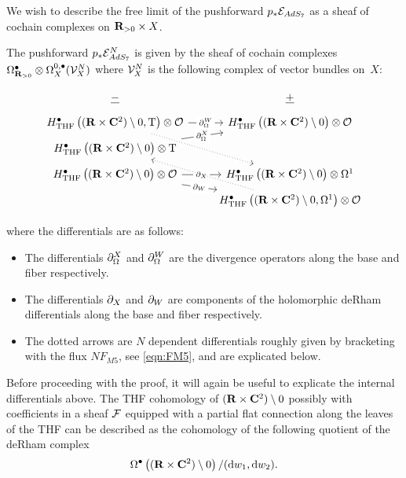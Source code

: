 \documentclass[../main.tex]{subfiles}
\begin{document}
We wish to describe the free limit of the pushforward $p_* \mathcal{E}_{AdS_7}$ as a sheaf of cochain complexes on $\mathbf{R}_{>0}\times X$. 

\begin{prop}\label{prop:ads7push}
The pushforward $p_* \mathcal{E}^N_{AdS_7}$ is given by the sheaf of cochain complexes $\Omega^\bullet_{\mathbf{R}_{>0}} \otimes \Omega^{0,\bullet}_{X} (\mathcal{V}^N_X)$ where $\mathcal{V}^N_{X}$ is the following complex of vector bundles on~$X$:

\begin{equation}
  \label{eqn:ads7push} 
  \begin{tikzcd}[row sep = 1 ex]
    \ul{-} & \ul{+} \\
H^\bullet_{\mr{THF}} \left ((\R\times \C^2)\setminus 0, \T \right ) \otimes \mc{O}\ar[r, "\del^W_\Omega" description]\ar[ddr, dotted] & H^\bullet_{\mr{THF}} \left ((\R\times \C^2)\setminus 0 \right ) \otimes \mc O \\
H^\bullet_{\mr{THF}} \left ((\R\times \C^2)\setminus 0 \right )  \otimes \T\ar[ur, "\del^X_\Omega" description] \\
H^\bullet_{\mr{THF}} \left ((\R\times \C^2)\setminus 0 \right )\otimes \mc{O}\ar[r, "\del_X" description]\ar[dr, "\del_W" description] & H^\bullet_{\mr{THF}} \left ((\R\times \C^2)\setminus 0 \right ) \otimes \Omega^1 \\ & H^\bullet_{\mr{THF}} \left ((\R\times \C^2)\setminus 0, \Omega^1 \right )  \otimes \mc O\ar[uul, dotted]
\end{tikzcd}
\end{equation}

where the differentials are as follows:

\begin{itemize}
\item The differentials $\partial_\Omega^X$ and $\partial_\Omega^W$ are the divergence operators along the base and fiber respectively.
\item The differentials $\partial_X$ and $\partial_W$ are components of the holomorphic deRham differentials along the base and fiber respectively.
\item The dotted arrows are $N$ dependent differentials roughly given by bracketing with the flux $N F_{M5}$, see \eqref{eqn:FM5}, and are explicated below. 
\end{itemize}
\end{prop}

Before proceeding with the proof, it will again be useful to explicate the internal differentials above. The THF cohomology of $(\mathbf{R}\times \mathbf{C}^2) \setminus 0$ possibly with coefficients in a sheaf $\mathcal{F}$ equipped with a partial flat connection along the leaves of the THF can be described as the cohomology of the following quotient of the deRham complex 
\[\Omega^\bullet \left ((\mathbf{R}\times \mathbf{C}^2) \setminus 0 \right) / (\mathrm{d} w_1, \mathrm{d} w_2) .\] 
\end{document}
